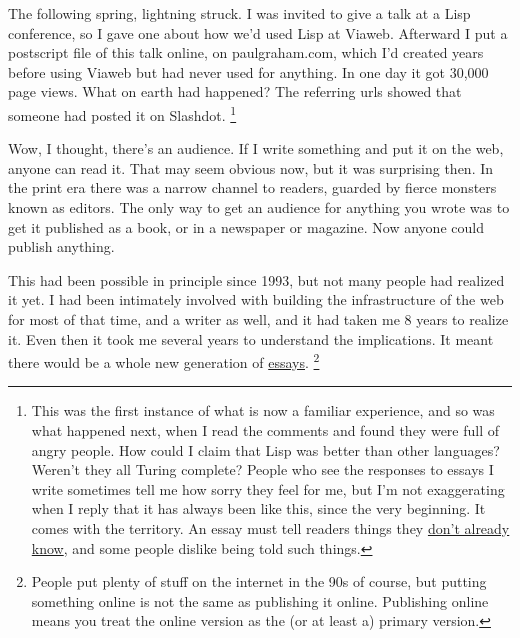 The following spring, lightning struck. I was invited to give a talk at
a Lisp conference, so I gave one about how we'd used Lisp at Viaweb.
Afterward I put a postscript file of this talk online, on
paulgraham.com, which I'd created years before using Viaweb but had
never used for anything. In one day it got 30,000 page views. What on
earth had happened? The referring urls showed that someone had posted it
on Slashdot. \footnote{This was the first instance of what is now a familiar
experience, and so was what happened next, when I read the comments and
found they were full of angry people. How could I claim that Lisp was
better than other languages? Weren't they all Turing complete? People
who see the responses to essays I write sometimes tell me how sorry they
feel for me, but I'm not exaggerating when I reply that it has always
been like this, since the very beginning. It comes with the territory.
An essay must tell readers things they \href{useful.html}{don't already
know}, and some people dislike being told such things.}

Wow, I thought, there's an audience. If I write something and put it on
the web, anyone can read it. That may seem obvious now, but it was
surprising then. In the print era there was a narrow channel to readers,
guarded by fierce monsters known as editors. The only way to get an
audience for anything you wrote was to get it published as a book, or in
a newspaper or magazine. Now anyone could publish anything.

This had been possible in principle since 1993, but not many people had
realized it yet. I had been intimately involved with building the
infrastructure of the web for most of that time, and a writer as well,
and it had taken me 8 years to realize it. Even then it took me several
years to understand the implications. It meant there would be a whole
new generation of \href{essay.html}{essays}. \footnote{People put plenty of stuff on the internet in the 90s of
course, but putting something online is not the same as publishing it
online. Publishing online means you treat the online version as the (or
at least a) primary version.}

